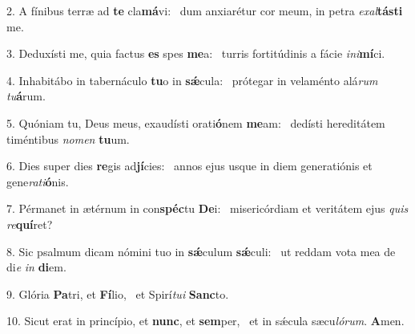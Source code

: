 2. A fínibus terræ ad \textbf{te} cla\textbf{má}vi: \ast\  dum anxiarétur cor meum, in petra \textit{ex}\textit{al}\textbf{tás}\textbf{ti} me.\

3. Deduxísti me, quia factus \textbf{es} spes \textbf{me}a: \ast\  turris fortitúdinis a fácie \textit{in}\textit{i}\textbf{mí}ci.\

4. Inhabitábo in tabernáculo \textbf{tu}o in \textbf{sǽ}cula: \ast\  prótegar in velaménto alá\textit{rum} \textit{tu}\textbf{á}rum.\

5. Quóniam tu, Deus meus, exaudísti orati\textbf{ó}nem \textbf{me}am: \ast\  dedísti hereditátem timéntibus \textit{no}\textit{men} \textbf{tu}um.\

6. Dies super dies \textbf{re}gis ad\textbf{jí}cies: \ast\  annos ejus usque in diem generatiónis et gene\textit{ra}\textit{ti}\textbf{ó}nis.\

7. Pérmanet in ætérnum in con\textbf{spéc}tu \textbf{De}i: \ast\  misericórdiam et veritátem ejus \textit{quis} \textit{re}\textbf{quí}ret?\

8. Sic psalmum dicam nómini tuo in \textbf{sǽ}culum \textbf{sǽ}culi: \ast\  ut reddam vota mea de di\textit{e} \textit{in} \textbf{di}em.\

9. Glória \textbf{Pa}tri, et \textbf{Fí}lio, \ast\  et Spirí\textit{tu}\textit{i} \textbf{Sanc}to.\

10. Sicut erat in princípio, et \textbf{nunc}, et \textbf{sem}per, \ast\  et in sǽcula sæcu\textit{ló}\textit{rum}. \textbf{A}men.\

